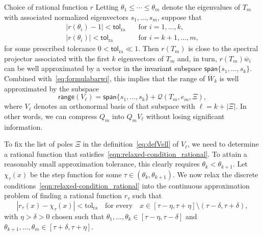 \documentclass{siamart190516}
\newcommand{\tol}{\mathsf{tol}}
\newcommand{\range}{\mathsf{range}}
\providecommand{\spa}[1]{\mathsf{span}\{#1\}}
\providecommand{\abs}[1]{\lvert#1\rvert}
\providecommand{\edit}[1]{\textcolor{black}{#1}}
\begin{document}
\begin{paragraph}{Choice of rational function $r$}
 Letting $\theta_1 \leq \dotsb \leq \theta_m$ denote the eigenvalues of $T_{m}$ with associated normalized eigenvectors $s_{1},\dotsc,s_{m}$, suppose that
\begin{equation}
    \label{eqn:relaxed-condition_rational}
    \begin{aligned}
        \abs{r(\theta_i)-1}< \tol_{\mathrm{ra}}& \quad \text{for } i = 1, \dotsc, k, \\ 
        \abs{r(\theta_i)} < \tol_{\mathrm{ra}}& \quad \text{for }i = k+1, \dotsc, m,
    \end{aligned}         
\end{equation}
for some prescribed tolerance $0<\tol_{\mathrm{ra}} \ll 1$. Then $r(T_{m})$ is close to the spectral projector associated with the first $k$ eigenvectors of $T_{m}$ and, in turn, $r(T_{m})\overline{w}_{i}$ can be well approximated by a vector in \edit{the invariant subspace} $\spa{s_1, \dotsc, s_k}$.
Combined with~\eqref{eq:formulabarwi}, this implies that the range of 
$\overline{W}_{k}$ is well approximated by the subspace
\begin{equation}
    \label{eq:defVell}
    \range(V_{\ell}) = \spa{s_{1},\dotsc,s_{k}}+\mathcal{Q}(T_{m},e_m,\Xi),
\end{equation}
where $V_{\ell}$ denotes an orthonormal basis of that subspace with $\ell = k + \abs{\Xi}$.
In other words, we can compress $Q_{m}$ into $Q_{m}V_{\ell}$ without losing significant information.

To fix the list of poles $\Xi$ in the definition~\eqref{eq:defVell} of $V_{\ell}$, we need to
determine a rational function that satisfies~\cref{eqn:relaxed-condition_rational}. To attain a reasonably small approximation tolerance, this clearly requires $\theta_k < \theta_{k+1}$.
Let $\chi_{\tau}(x)$ be the step function for some 
$\tau \in (\theta_{k}, \theta_{k+1})$.
We now relax the discrete conditions~\cref{eqn:relaxed-condition_rational} into the continuous approximation problem of finding a rational function $r_\tau$ such that
\begin{equation}\label{eqn:rat_approx}
    |r_{\tau}(x) - \chi_{\tau}(x)| < \text{tol}_{\mathrm{ra}} \quad \text{for every} \quad x \in [\tau-\eta, \tau +\eta] \setminus (\tau - \delta, \tau + \delta),
\end{equation}
with $\eta>\delta>0$ chosen such that $\theta_1,\ldots,\theta_k \in [\tau-\eta,\tau-\delta]$ and $\theta_{k+1},\ldots,\theta_m \in [\tau+\delta, \tau+\eta]$.


\end{paragraph}
\end{document}
